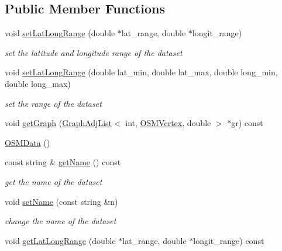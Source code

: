 \subsection*{Public Member Functions}
\begin{DoxyCompactItemize}
\item 
void \hyperlink{classbridges_1_1dataset_1_1_o_s_m_data_abb602dbb1e86cc8c37bdc6376a2d1463}{set\+Lat\+Long\+Range} (double $\ast$lat\+\_\+range, double $\ast$longit\+\_\+range)
\begin{DoxyCompactList}\small\item\em set the latitude and longitude range of the dataset \end{DoxyCompactList}\item 
void \hyperlink{classbridges_1_1dataset_1_1_o_s_m_data_aba8bf3a70d17423d335773f025eaafa8}{set\+Lat\+Long\+Range} (double lat\+\_\+min, double lat\+\_\+max, double long\+\_\+min, double long\+\_\+max)
\begin{DoxyCompactList}\small\item\em set the range of the dataset \end{DoxyCompactList}\item 
void \hyperlink{classbridges_1_1dataset_1_1_o_s_m_data_a4393ea434040850f1f9ffede837313e7}{get\+Graph} (\hyperlink{classbridges_1_1datastructure_1_1_graph_adj_list}{Graph\+Adj\+List}$<$ int, \hyperlink{classbridges_1_1dataset_1_1_o_s_m_vertex}{O\+S\+M\+Vertex}, double $>$ $\ast$gr) const
\item 
\hyperlink{classbridges_1_1dataset_1_1_o_s_m_data_a53a8b50f2726dd90e7e0f78690abf121}{O\+S\+M\+Data} ()
\item 
const string \& \hyperlink{classbridges_1_1dataset_1_1_o_s_m_data_a434fa34e00e644ad04ca305d10a2c8e0}{get\+Name} () const
\begin{DoxyCompactList}\small\item\em get the name of the dataset \end{DoxyCompactList}\item 
void \hyperlink{classbridges_1_1dataset_1_1_o_s_m_data_aba68aa38305990876b4dbe5c92764ffd}{set\+Name} (const string \&n)
\begin{DoxyCompactList}\small\item\em change the name of the dataset \end{DoxyCompactList}\item 
void \hyperlink{classbridges_1_1dataset_1_1_o_s_m_data_ad63fda9eca521ce48e99753229ada4d1}{get\+Lat\+Long\+Range} (double $\ast$lat\+\_\+range, double $\ast$longit\+\_\+range) const

\end{DoxyCompactItemize}
